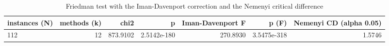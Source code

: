 \begin{table}[htbp]
\centering
\small
\caption{Friedman test with the Iman-Davenport correction and the Nemenyi critical difference}
\label{tab:E4a_equal_budgets_b10_friedman_test}
\begin{tabular}{lrrrrrr}
\toprule
instances (N) & methods (k) & chi2 & p & Iman-Davenport F & p (F) & Nemenyi CD (alpha 0.05) \\
\midrule
112 & 12 & 873.9102 & 2.5142e-180 & 270.8930 & 3.5475e-318 & 1.5746 \\
\bottomrule
\end{tabular}
\end{table}
